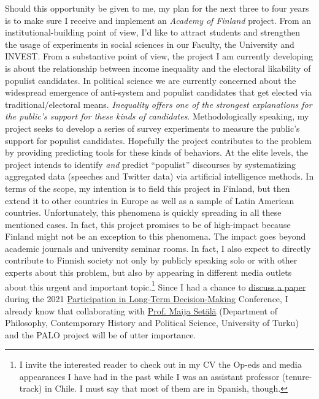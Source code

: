 \documentclass[10pt,stdletter,dateno,sigleft]{newlfm} %
\begin{document}
\begin{newlfm}
Should this opportunity be given to me, my plan for the next three to four years is to make sure I receive and implement an \emph{Academy of Finland} project. From an institutional-building point of view, I'd like to attract students and strengthen the usage of experiments in social sciences in our Faculty, the University and INVEST. From a substantive point of view, the project I am currently developing is about the relationship between income inequality and the electoral likability of populist candidates. In political science we are currently concerned about the widespread emergence of anti-system and populist candidates that get elected via traditional/electoral means. \emph{Inequality offers one of the strongest explanations for the public's support for these kinds of candidates}. Methodologically speaking, my project seeks to develop a series of survey experiments to measure the public's support for populist candidates. Hopefully the project contributes to the problem by providing predicting tools for these kinds of behaviors. At the elite levels, the project intends to identify \emph{and} predict ``populist'' discourses by systematizing aggregated data (speeches and Twitter data) via artificial intelligence methods. In terms of the scope, my intention is to field this project in Finland, but then extend it to other countries in Europe as well as a sample of Latin American countries. Unfortunately, this phenomena is quickly spreading in all these mentioned cases. In fact, this project promises to be of high-impact because Finland might not be an exception to this phenomena. The impact goes beyond academic journals and university seminar rooms. In fact, I also expect to directly contribute to Finnish society not only by publicly speaking solo or with other experts about this problem, but also by appearing in different media outlets about this urgent and important topic.\footnote{I invite the interested reader to check out in my CV the Op-eds and media appearances I have had in the past while I was an assistant professor (tenure-track) in Chile. I must say that most of them are in Spanish, though.} Since I had a chance to \href{https://paloresearch.fi/en/events/}{discuss a paper} during the 2021 \href{https://paloresearch.fi/en/}{Participation in Long-Term Decision-Making} Conference, I already know that collaborating with \href{https://www.utu.fi/en/people/maija-setala}{Prof. Maija Set{\"a}l{\"a}} (Department of Philosophy, Contemporary History and Political Science, University of Turku) and the PALO project will be of utter importance. 


\end{newlfm}
\end{document}
